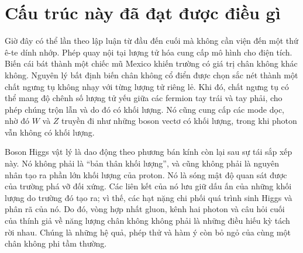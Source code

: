 \section{Cấu trúc này đã đạt được điều gì}

Giờ đây có thể lần theo lập luận từ đầu đến cuối mà không cần viện đến một thứ ê-te dính nhớp. Phép quay nội tại lượng tử hóa cung cấp mô hình cho điện tích. Biến cái bát thành một chiếc mũ Mexico khiến trường có giá trị chân không khác không. Nguyên lý bất định biến chân không cổ điển được chọn sắc nét thành một chất ngưng tụ không nhạy với từng lượng tử riêng lẻ. Khi đó, chất ngưng tụ có thể mang độ chênh số lượng tử yếu giữa các fermion tay trái và tay phải, cho phép chúng trộn lẫn và do đó có khối lượng. Nó cũng cung cấp các mode dọc, nhờ đó $W$ và $Z$ truyền đi như những boson vectơ có khối lượng, trong khi photon vẫn không có khối lượng.

Boson Higgs vật lý là dao động theo phương bán kính còn lại sau sự tái sắp xếp này. Nó không phải là ``bản thân khối lượng'', và cũng không phải là nguyên nhân tạo ra phần lớn khối lượng của proton. Nó là sóng mật độ quan sát được của trường phá vỡ đối xứng. Các liên kết của nó lưu giữ dấu ấn của những khối lượng do trường đó tạo ra; vì thế, các hạt nặng chi phối quá trình sinh Higgs và phân rã của nó. Do đó, vòng hợp nhất gluon, kênh hai photon và câu hỏi cuối của thính giả về năng lượng chân không không phải là những điều hiếu kỳ tách rời nhau. Chúng là những hệ quả, phép thử và hàm ý còn bỏ ngỏ của cùng một chân không phi tầm thường.
